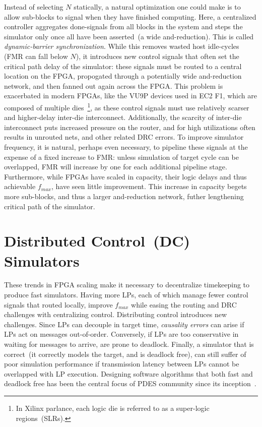 Instead of selecting $N$ statically, a natural optimization one could make is to allow sub-blocks to signal when they have
finished computing. Here, a centralized controller aggregates done-signals from all
blocks in the system and steps the simulator only once all have been
asserted~(a wide and-reduction). This is called \emph{dynamic-barrier
synchronization}. While this removes wasted host idle-cycles (FMR can fall
below $N$), it introduces new control signals that often set the critical
path delay of the simulator: these signals must be routed to a central
location on the FPGA, propogated through a potentially wide and-reduction network, and then fanned out again across the FPGA.
This problem is exacerbated in modern FPGAs, like the VU9P devices used in EC2 F1, which are composed of multiple
dies~\footnote{In Xilinx parlance, each logic die is referred to as a
super-logic regions~(SLRs).}, as these control signals must use relatively
scarser and higher-delay inter-die interconnect. Additionally, the scarcity of inter-die interconnect
puts increased pressure on the router, and for high utilizations often results
in unrouted nets, and other related DRC errors.  To improve simulator
frequency, it is natural, perhaps even necessary, to pipeline these signals at
the expense of a fixed increase to FMR: unless simulation of target cycle can
be overlapped, FMR will increase by one for each additional pipeline stage. Furthermore, while
FPGAs have scaled in capacity, their logic delays and thus achievable
$f_{max}$, have seen little improvement. This increase in capacity begets
more sub-blocks, and thus a larger and-reduction
network, futher lengthening critical path of the simulator.

\section{Distributed Control~(DC) Simulators}
These trends in FPGA scaling make it necessary to decentralize timekeeping to
produce fast simulators.  Having more LPs, each of which manage fewer control
signals that routed locally, improve ${f_{max}}$ while easing the routing and
DRC challenges with centralizing control. Distributing control introduces new
challenges.  Since LPs can decouple in target time, \emph{causality errors} can
arise if LPs act on messages out-of-order. Conversely, if LPs are too
conservative in waiting for messages to arrive, are prone to deadlock.
Finally, a simulator that is correct~(it correctly models the target, and is
deadlock free), can still suffer of poor simulation performance if transmission
latency between LPs cannot be overlapped with LP execution. Designing software
algorithms that both fast and deadlock free has been the central focus of PDES
community since its inception~\cite{FujimotoPDESPrimer}.

